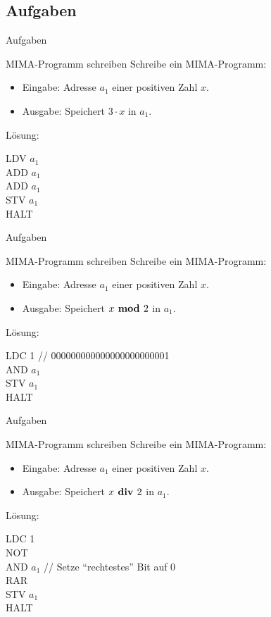 \subsection{Aufgaben}

\begin{frame}{Aufgaben}
	\begin{taskblock}{MIMA-Programm schreiben}
		Schreibe ein MIMA-Programm:
		\begin{itemize}
			\item Eingabe: Adresse $a_1$ einer positiven Zahl $x$.
			\item Ausgabe: Speichert $3 \cdot x$ in $a_1$.
		\end{itemize}
	\end{taskblock}
	
	\bp \vspace{.5cm} Lösung:
	
	LDV $a_1$ \\ ADD $a_1$ \\ ADD $a_1$ \\ STV $a_1$ \\ HALT
\end{frame}

\begin{frame}{Aufgaben}
	\begin{taskblock}{MIMA-Programm schreiben}
		Schreibe ein MIMA-Programm:
		\begin{itemize}
			\item Eingabe: Adresse $a_1$ einer positiven Zahl $x$.
			\item Ausgabe: Speichert $x \textbf{ mod } 2$ in $a_1$.
		\end{itemize}
	\end{taskblock}

	\bp \vspace{.5cm} Lösung:
	
	LDC 1 \quad // 000000000000000000000001 \\ AND $a_1$ \\ STV $a_1$ \\ HALT
\end{frame}

\begin{frame}{Aufgaben}
	\begin{taskblock}{MIMA-Programm schreiben}
		Schreibe ein MIMA-Programm:
		\begin{itemize}
			\item Eingabe: Adresse $a_1$ einer positiven Zahl $x$.
			\item Ausgabe: Speichert $x \textbf{ div } 2$ in $a_1$.
		\end{itemize}
	\end{taskblock}
	
	\bp \vspace{.5cm} Lösung:
	
	LDC 1 \\ NOT \\ AND $a_1$ \quad // Setze ``rechtestes'' Bit auf 0 \\ RAR \\ STV $a_1$ \\ HALT
\end{frame}

